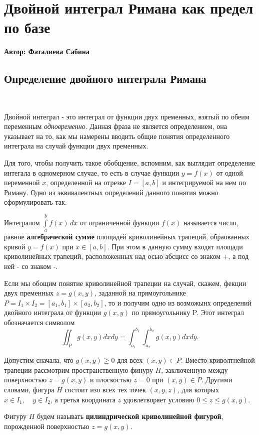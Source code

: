 \chapter{Двойной интеграл Римана как предел по базе}
\centerline{ \bf Автор: Фаталиева Сабина} \vskip 1cm

\section{Определение двойного интеграла Римана}

\ \par Двойной интеграл - это интеграл от функции двух пременных, взятый по обеим переменным \textit{одновременно}. Данная фраза не является определением, она указывает на то, как мы намерены вводить общие понятия определенного интеграла на случай функции двух пременных.
\par Для того, чтобы получить такое обобщение, вспомним, как выглядит определение интегала в одномерном случае, то есть в случае функции $y=f(x)$ от одной переменной $x$, определенной на отрезке $I=[a,b]$ и интегрируемой на нем по Риману. Одно из эквивалентных определений данного понятия можно сформулировать так.
\begin{object} 
Интегралом $\int\limits_{a}^{b}f(x)\,dx$ от ограниченной функции $f(x)$ называется число, равное \textbf{алгебраческой сумме} площадей криволинейных трапеций, обраованных кривой $y=f(x)$ при $x\in{[a,b]}$. При этом в данную сумму входят площади криволинейных трапеций, расположенных над осью абсцисс со знаком +, а под ней - со знаком -.
\end{object}
\par Если мы обощим понятие криволинейной трапеции на случай, скажем, фекции двух пременных $z=g(x,y)$, заданной на прямоугольнике $P=I_1\times I_2=[a_1,b_1]\times [a_2,b_2]$, то и получим одно из возможынх определений двойного интеграла от функции $g(x,y)$ по прямоугольнику P.  Этот интеграл обозначается символом $$\iint_P g(x,y)dxdy=\int_{a_1}^{b_1}\int_{a_2}^{b_2} g(x,y)dxdy.$$
\par Допустим сначала, что $g(x,y)\ge 0$ для всех $(x,y)\in P$. Вместо криволтнейной трапеции рассмотрим пространственную финуру $H$, заключенную между поверхностью $z=g(x,y)$ и плоскостью $z=0$ при $(x,y)\in P$. Другими словами, фигура $H$ состоит изо всех тех точек $(x,y,z)$, для которых $x\in I_1,\quad y\in I_2$, а третья координата $z$ удовлетворяет условию $0\le z\le g(x,y)$. 
\begin{object}
Фигуру $H$ будем называть \textbf{цилиндрической криволинейной фигурой}, порожденной поверхностью $z=g(x,y)$.
\end{object}
